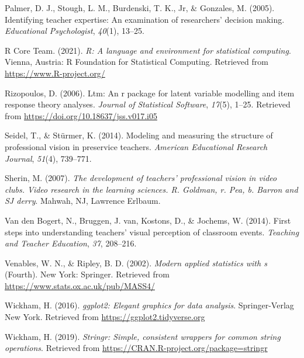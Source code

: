 \documentclass[
  man,floatsintext]{apa6}
\newlength{\cslhangindent}
\newlength{\cslentryspacingunit} %
\newenvironment{CSLReferences}[2] %
 {%
  \setlength{\parindent}{0pt}
  \ifodd #1
  \let\oldpar\par
  \def\par{\hangindent=\cslhangindent\oldpar}
  \fi
  \setlength{\parskip}{#2\cslentryspacingunit}
 }%
 {}
\begin{document}
\begin{CSLReferences}{1}{0}
\leavevmode{}%
Palmer, D. J., Stough, L. M., Burdenski, T. K., Jr, \& Gonzales, M. (2005). Identifying teacher expertise: An examination of researchers' decision making. \emph{Educational Psychologist}, \emph{40}(1), 13--25.

\leavevmode{}%
R Core Team. (2021). \emph{R: A language and environment for statistical computing}. Vienna, Austria: R Foundation for Statistical Computing. Retrieved from \url{https://www.R-project.org/}

\leavevmode{}%
Rizopoulos, D. (2006). Ltm: An r package for latent variable modelling and item response theory analyses. \emph{Journal of Statistical Software}, \emph{17}(5), 1--25. Retrieved from \url{https://doi.org/10.18637/jss.v017.i05}

\leavevmode{}%
Seidel, T., \& Stürmer, K. (2014). Modeling and measuring the structure of professional vision in preservice teachers. \emph{American Educational Research Journal}, \emph{51}(4), 739--771.

\leavevmode{}%
Sherin, M. (2007). \emph{The development of teachers' professional vision in video clubs. Video research in the learning sciences. R. Goldman, r. Pea, b. Barron and SJ derry}. Mahwah, NJ, Lawrence Erlbaum.

\leavevmode{}%
Van den Bogert, N., Bruggen, J. van, Kostons, D., \& Jochems, W. (2014). First steps into understanding teachers' visual perception of classroom events. \emph{Teaching and Teacher Education}, \emph{37}, 208--216.

\leavevmode{}%
Venables, W. N., \& Ripley, B. D. (2002). \emph{Modern applied statistics with s} (Fourth). New York: Springer. Retrieved from \url{https://www.stats.ox.ac.uk/pub/MASS4/}

\leavevmode{}%
Wickham, H. (2016). \emph{ggplot2: Elegant graphics for data analysis}. Springer-Verlag New York. Retrieved from \url{https://ggplot2.tidyverse.org}

\leavevmode{}%
Wickham, H. (2019). \emph{Stringr: Simple, consistent wrappers for common string operations}. Retrieved from \url{https://CRAN.R-project.org/package=stringr}


\end{CSLReferences}
\end{document}
